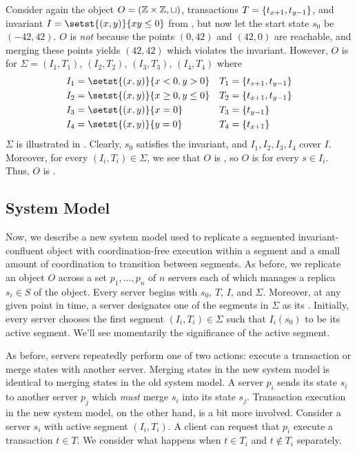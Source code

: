 {}

\begin{example}
  Consider again the object $O = (\mathbb{Z} \times \mathbb{Z}, \sqcup)$, transactions $T
  = \{t_{x+1}, t_{y-1}\}$, and invariant $I = \setst{(x, y)}{xy \leq 0}$ from
  , but now let the start state $s_0$ be $(-42, 42)$. $O$ is
  \emph{not} \sTISconfluent{} because the points $(0, 42)$ and $(42, 0)$ are
  reachable, and merging these points yields $(42, 42)$ which violates the
  invariant. However, $O$ is \sTISconfluent{} for $\Sigma = (I_1, T_1)$, $(I_2,
  T_2)$, $(I_3, T_3)$, $(I_4, T_4)$ where
  \begin{align*}
    I_1 &= \setst{(x, y)}{x < 0, y > 0}       &T_1 &= \set{t_{x+1}, t_{y-1}} \\
    I_2 &= \setst{(x, y)}{x \geq 0, y \leq 0} &T_2 &= \set{t_{x+1}, t_{y-1}} \\
    I_3 &= \setst{(x, y)}{x = 0}              &T_3 &= \set{t_{y-1}} \\
    I_4 &= \setst{(x, y)}{y = 0}              &T_4 &= \set{t_{x+1}}
  \end{align*}
  $\Sigma$ is illustrated in . Clearly, $s_0$ satisfies the
  invariant, and $I_1, I_2, I_3, I_4$ cover $I$. Moreover, for every $(I_i,
  T_i) \in \Sigma$, we see that $O$ is , so $O$ is
   for every $s \in I_i$. Thus, $O$ is
  \sTISconfluent{}.
\end{example}

\subsection{System Model}
Now, we describe a new system model used to replicate a segmented
invariant-confluent object with coordination-free execution within a segment
and a small amount of coordination to transition between segments. As before,
we replicate an object $O$ across a set $p_1, \ldots, p_n$ of $n$ servers each
of which manages a replica $s_i \in S$ of the object. Every server begins with
$s_0$, $T$, $I$, and $\Sigma$. Moreover, at any given point in time, a server
designates one of the segments in $\Sigma$ as its .
Initially, every server chooses the first segment $(I_i, T_i) \in \Sigma$ such
that $I_i(s_0)$ to be its active segment. We'll see momentarily the
significance of the active segment.

As before, servers repeatedly perform one of two actions: execute a transaction
or merge states with another server. Merging states in the new system model is
identical to merging states in the old system model. A server $p_i$ sends its
state $s_i$ to another server $p_j$ which \emph{must} merge $s_i$ into its
state $s_j$.
%
Transaction execution in the new system model, on the other hand, is a bit more
involved. Consider a server $s_i$ with active segment $(I_i, T_i)$. A client
can request that $p_i$ execute a transaction $t \in T$. We consider what
happens when $t \in T_i$ and $t \notin T_i$ separately.

